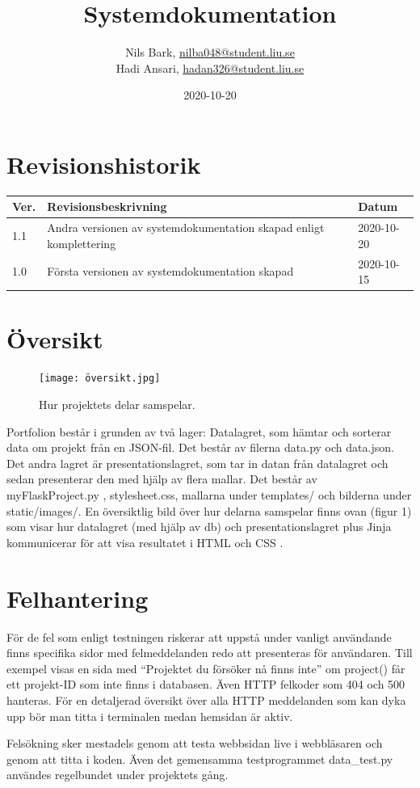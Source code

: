 \documentclass{TDP003mall}
\author{Nils Bark, \url{nilba048@student.liu.se}\\
  Hadi Ansari, \url{hadan326@student.liu.se}}
\title{Systemdokumentation}
\date{2020-10-20}
\begin{document}
\projectpage
\section{Revisionshistorik}
\begin{table}[!h]
\begin{tabularx}{\linewidth}{|l|X|l|}
\hline
Ver. & Revisionsbeskrivning & Datum \\\hline
1.1 & Andra versionen av systemdokumentation skapad enligt komplettering & 2020-10-20 \\\hline
1.0 & Första versionen av systemdokumentation skapad & 2020-10-15 \\\hline
\end{tabularx}
\end{table}

\section{Översikt}
\begin{figure}[h!]
  \centering
  \texttt{[image: översikt.jpg]}
  \label{Bild 1}
  \caption{Hur projektets delar samspelar.}
\end{figure}
Portfolion består i grunden av två lager: Datalagret, som hämtar och sorterar data om projekt från en JSON-fil. Det består av filerna data.py och data.json.
Det andra lagret är presentationslagret, som tar in datan från datalagret och sedan presenterar den med hjälp av flera mallar. Det består av myFlaskProject.py
, stylesheet.css, mallarna under templates/ och bilderna under static/images/. En översiktlig bild över hur delarna samspelar finns ovan (figur 1) som visar hur
datalagret (med hjälp av db) och presentationslagret plus Jinja kommunicerar för att visa resultatet i HTML och CSS .


\section{Felhantering}
För de fel som enligt testningen riskerar att uppstå under vanligt användande finns specifika sidor med felmeddelanden redo att presenteras för användaren.
Till exempel visas en sida med ``Projektet du försöker nå finns inte'' om project() får ett projekt-ID som inte finns i databasen. Även HTTP felkoder som
404 och 500 hanteras. För en detaljerad översikt över alla HTTP meddelanden som kan dyka upp bör man titta i terminalen medan hemsidan är aktiv.

Felsökning sker mestadels genom att testa webbsidan live i webbläsaren och genom att titta i koden. Även det gemensamma testprogrammet data\_test.py användes
regelbundet under projektets gång.
\end{document}
